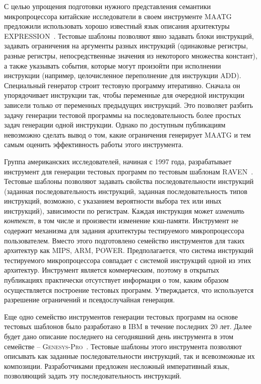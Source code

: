 С целью упрощения подготовки нужного представления семантики
микропроцессора китайские исследователи в своем инструменте
\textsc{MAATG}~\cite{MAATG} предложили использовать хорошо известный
язык описания архитектуры EXPRESSION~\cite{EXPRESSION}. Тестовые
шаблоны позволяют явно задавать блоки инструкций, задавать
ограничения на аргументы разных инструкций (одинаковые регистры,
разные регистры, непосредственные значения из некоторого множества
констант), а также указывать события, которые могут произойти при
исполнении инструкции (например, целочисленное переполнение для
инструкции ADD). Специальный генератор строит тестовую программу
итеративно. Сначала он упорядочивает инструкции так, чтобы
переменные для очередной инструкции зависели только от переменных
предыдущих инструкций. Это позволяет разбить задачу генерации
тестовой программы на последовательность более простых задач
генерации одной инструкции. Однако по доступным публикациям
невозможно сделать вывод о том, какие ограничения генерирует MAATG и
тем самым оценить эффективность работы этого инструмента.

Группа американских исследователей, начиная с 1997 года,
разрабатывает инструмент для генерации тестовых программ по тестовым
шаблонам \textsc{RAVEN}~\cite{RAVEN}. Тестовые шаблоны позволяют
задавать свойства последовательности инструкций (заданная
последовательность инструкций, заданная последовательность типов
инструкций, возможно, с указанием вероятности выбора тех или иных
инструкций), зависимости по регистрам. Каждая инструкция может
\emph{изменить контекст}, в том числе и произвести изменение
кэш-памяти. Инструмент не содержит механизма для задания архитектуры
тестируемого микропроцессора пользователем. Вместо этого
подготовлено семейство инструментов для таких архитектур как MIPS,
ARM, POWER. Предполагается, что система инструкций тестируемого
микропроцессора совпадает с системой инструкций одной из этих
архитектур. Инструмент является коммерческим, поэтому в открытых
публикациях практически отсутствует информация о том, каким образом
осуществляется построение тестовых программ. Утверждается, что
используется разрешение ограничений и псевдослучайная генерация.

Еще одно семейство инструментов генерации тестовых программ на
основе тестовых шаблонов было разработано в IBM в течение последних
20 лет. Далее будет дано описание последнего на сегодняшний день
инструмента в этом семействе --
\textsc{Genesys-Pro}~\cite{GenesysPro2004}. Тестовые шаблоны этого
инструмента позволяют описывать как заданные последовательности
инструкций, так и всевозможные их композиции. Разработчиками
предложен несложный императивный язык, позволяющий задать эту
последовательность инструкций.

